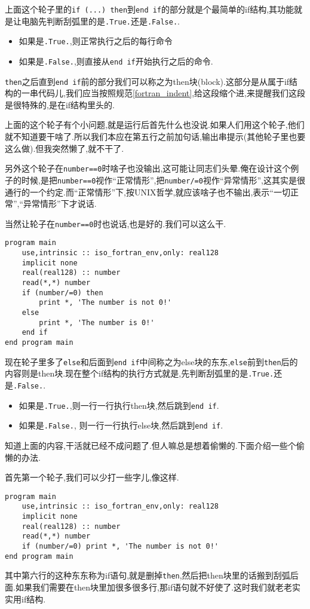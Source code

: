 上面这个轮子里的\texttt{if (...) then}到\texttt{end if}的部分就是个最简单的if结构,其功能就是让电脑先判断刮弧里的是\texttt{.True.}还是\texttt{.False.}.
\begin{itemize}
    \item 如果是\texttt{.True.},则正常执行之后的每行命令
    \item 如果是\texttt{.False.},则直接从\texttt{end if}开始执行之后的命令.
\end{itemize}

\texttt{then}之后直到\texttt{end if}前的部分我们可以称之为then块(block).这部分是从属于if结构的一串代码儿,我们应当按照规范\ref{fortran_indent},给这段缩个进,来提醒我们这段是很特殊的,是在if结构里头的.

上面的这个轮子有个小问题,就是运行后首先什么也没说.如果人们用这个轮子,他们就不知道要干啥了.所以我们本应在第五行之前加句话,输出串提示(其他轮子里也要这么做).但我突然懒了,就不干了.

另外这个轮子在\texttt{number==0}时啥子也没输出,这可能让同志们头晕.俺在设计这个例子的时候,是把\texttt{number==0}视作``正常情形'',把\texttt{number/=0}视作``异常情形'',这其实是很通行的一个约定.而``正常情形''下,按UNIX哲学,就应该啥子也不输出,表示``一切正常'',``异常情形''下才说话.

当然让轮子在\texttt{number==0}时也说话,也是好的.我们可以这么干.\newpage
\begin{lstlisting}
program main
    use,intrinsic :: iso_fortran_env,only: real128
    implicit none
    real(real128) :: number
    read(*,*) number
    if (number/=0) then
        print *, 'The number is not 0!'
    else
        print *, 'The number is 0!'
    end if
end program main
\end{lstlisting}
现在轮子里多了\texttt{else}和后面到\texttt{end if}中间称之为else块的东东,\texttt{else}前到\texttt{then}后的内容则是then块.现在整个if结构的执行方式就是,先判断刮弧里的是\texttt{.True.}还是\texttt{.False.}.
\begin{itemize}
    \item 如果是\texttt{.True.},则一行一行执行then块,然后跳到\texttt{end if}.
    \item 如果是\texttt{.False.}, 则一行一行执行else块,然后跳到\texttt{end if}.
\end{itemize}

知道上面的内容,干活就已经不成问题了.但人嘛总是想着偷懒的.下面介绍一些个偷懒的办法.

首先第一个轮子,我们可以少打一些字儿,像这样.
\begin{lstlisting}
program main
    use,intrinsic :: iso_fortran_env,only: real128
    implicit none
    real(real128) :: number
    read(*,*) number
    if (number/=0) print *, 'The number is not 0!'
end program main
\end{lstlisting}
其中第六行的这种东东称为if语句,就是删掉\texttt{then},然后把then块里的话搬到刮弧后面.如果我们需要在then块里加很多很多行,那if语句就不好使了.这时我们就老老实实用if结构.

